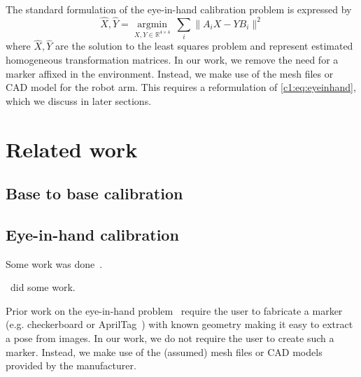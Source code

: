 The standard formulation of the eye-in-hand calibration problem is expressed by
\begin{equation}
\label{c1:eq:eyeinhand}
    \widehat{X}, \widehat{Y} = \underset{X, Y\in\mathbb{R}^{4\times 4}}{\text{arg}\min}~\sum_i \| A_i X - Y B_i\|^2
\end{equation}
where $\widehat{X}, \widehat{Y}$ are the solution to the least squares problem and represent estimated homogeneous transformation matrices.
In our work, we remove the need for a marker affixed in the environment.
Instead, we make use of the mesh files or CAD model for the robot arm.
This requires a reformulation of \eqref{c1:eq:eyeinhand}, which we discuss in later sections.

\section{Related work}

\subsection{Base to base calibration}

\subsection{Eye-in-hand calibration}

Some work was done~\cite{Li_2021}.

\cite{Bhat_2021_CVPR}~did some work.

Prior work on the eye-in-hand problem~\cite{Horaud95, Strobl06} require the user to fabricate a marker (e.g. checkerboard or AprilTag~\cite{Olson11}) with known geometry making it easy to extract a pose from images.
In our work, we do not require the user to create such a marker.
Instead, we make use of the (assumed) mesh files or CAD models provided by the manufacturer.


